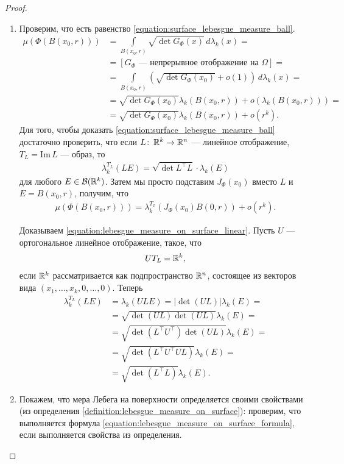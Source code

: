 \begin{proof}
\begin{enumerate}
 \item Проверим, что есть равенство \eqref{equation:surface_lebesgue_measure_ball}.
  \begin{align*}
   \mu(\Phi(B(x_0,r))) &= \int\limits_{B(x_0, r)} \sqrt{\det G_{\Phi}(x)} \, d\lambda_k(x) = \\
   &= [G_{\Phi} \text{ --- непрерывное отображение на } \Omega] = \\
   &= \int\limits_{B(x_0,r)} \left( \sqrt{ \det G_{\Phi}(x_0) } + o(1) \right) \, d\lambda_{k}(x) = \\
   &= \sqrt{\det G_{\Phi}(x_0)} \lambda_k(B(x_0, r)) + o(\lambda_k(B(x_0, r))) = \\
   &= \sqrt{ \det G_{\Phi}(x_0)  } \lambda_k(B(x_0, r)) + o(r^{k})
  .\end{align*} Для того, чтобы доказать \eqref{equation:surface_lebesgue_measure_ball} достаточно проверить, что если $L \colon\, \mathbb{R}^{k} \to \mathbb{R}^{n} $ --- линейное отображение, $T_L = \mathrm{Im}\,L$ --- образ, то
  \begin{align}
   \label{equation:lebesgue_measure_on_surface_linear}
   \lambda_k^{T_L}(LE) = \sqrt{\det L^{\top}L} \cdot \lambda_k(E)
  \end{align} для любого $E \in \mathcal{B}(\mathbb{R}^{k})$. Затем мы просто подставим $J_{\Phi}(x_0)$ вместо $L$ и $E = B(x_0, r)$, получим, что
  \begin{align*}
   \mu(\Phi(B(x_0, r))) = \lambda_k^{T_x} (J_{\Phi}(x_0) B(0, r)) + o(r^{k})
  .\end{align*}

  Доказываем \eqref{equation:lebesgue_measure_on_surface_linear}. Пусть $U$ --- ортогональное линейное отображение, такое, что
  \begin{align*}
   UT_L = \mathbb{R}^{k}
  ,\end{align*} если $\mathbb{R}^{k}$ рассматривается как подпространство $\mathbb{R}^{n}$, состоящее из векторов вида $(x_1, \ldots, x_k, 0, \ldots, 0)$. Теперь
  \begin{align*}
   \lambda_k^{T_L}(LE) &= \lambda_k(ULE) = \left| \det (UL) \right| \lambda_k(E) = \\ &= \sqrt{\det(UL)\det(UL)} \lambda_k(E) = \\
   &= \sqrt{\det(L^{\top}U^{\top}) \det(UL)} \lambda_k(E) = \\
   &= \sqrt{ \det(L^{\top}U^{\top}UL) } \lambda_k(E) = \\
   &= \sqrt{ \det (L^{\top} L) } \lambda_k(E)
  .\end{align*} 

 \item Покажем, что мера Лебега на поверхности определяется своими свойствами (из определения \ref{definition:lebesgue_measure_on_surface}): проверим, что выполняется формула \eqref{equation:lebesgue_measure_on_surface_formula}, если выполняется свойства из определения. 


\end{enumerate}
\end{proof}
